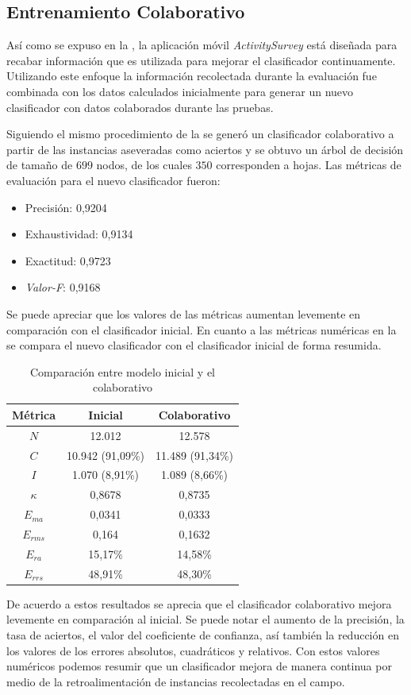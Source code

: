 \subsection{Entrenamiento Colaborativo}

\label{ssec6:colaboracion}Así como se expuso en la ,
la aplicación móvil \emph{ActivitySurvey} está diseñada para recabar
información que es utilizada para mejorar el clasificador continuamente.
Utilizando este enfoque la información recolectada durante la evaluación
fue combinada con los datos calculados inicialmente para generar un
nuevo clasificador con datos colaborados durante las pruebas.

Siguiendo el mismo procedimiento de la 
se generó un clasificador colaborativo a partir de las instancias
aseveradas como aciertos y se obtuvo un árbol de decisión de tamaño
de $699$ nodos, de los cuales $350$ corresponden a hojas. Las métricas
de evaluación para el nuevo clasificador fueron:
\begin{itemize}
\item Precisión: 0,9204
\item Exhaustividad: 0,9134
\item Exactitud: 0,9723
\item \emph{Valor-F}: 0,9168
\end{itemize}
Se puede apreciar que los valores de las métricas aumentan levemente
en comparación con el clasificador inicial. En cuanto a las métricas
numéricas en la  se compara el nuevo
clasificador con el clasificador inicial de forma resumida.

\begin{table}[H]
\begin{centering}
\begin{tabular}{|c|c|c|}
\hline 
Métrica & Inicial & Colaborativo\tabularnewline
\hline 
\hline 
$N$ & 12.012 & 12.578\tabularnewline
\hline 
$C$ & 10.942 (91,09\%) & 11.489 (91,34\%)\tabularnewline
\hline 
$I$ & 1.070 (8,91\%) & 1.089 (8,66\%)\tabularnewline
\hline 
$\kappa$ & 0,8678 & 0,8735\tabularnewline
\hline 
$E_{ma}$ & 0,0341 & 0,0333\tabularnewline
\hline 
$E_{rms}$ & 0,164 & 0,1632\tabularnewline
\hline 
$E_{ra}$ & 15,17\% & 14,58\%\tabularnewline
\hline 
$E_{rrs}$ & 48,91\% & 48,30\%\tabularnewline
\hline 
\end{tabular}
\par\end{centering}
\caption{\label{tab6:comparacion-clasi}Comparación entre modelo inicial y
el colaborativo}
\end{table}

De acuerdo a estos resultados se aprecia que el clasificador colaborativo
mejora levemente en comparación al inicial. Se puede notar el aumento
de la precisión, la tasa de aciertos, el valor del coeficiente de
confianza, así también la reducción en los valores de los errores
absolutos, cuadráticos y relativos. Con estos valores numéricos podemos
resumir que un clasificador mejora de manera continua por medio de
la retroalimentación de instancias recolectadas en el campo.

